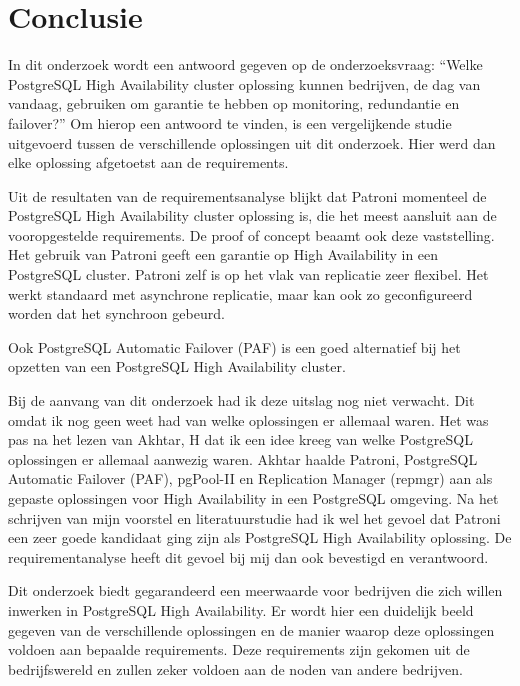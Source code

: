 
\chapter{Conclusie}
\label{ch:conclusie}

In dit onderzoek wordt een antwoord gegeven op de onderzoeksvraag: “Welke PostgreSQL High Availability cluster oplossing kunnen bedrijven, de dag van vandaag, gebruiken om garantie te hebben op monitoring, redundantie en failover?” Om hierop een antwoord te vinden, is een vergelijkende studie uitgevoerd tussen de verschillende oplossingen uit dit onderzoek. Hier werd dan elke oplossing afgetoetst aan de requirements.

Uit de resultaten van de requirementsanalyse blijkt dat Patroni momenteel de PostgreSQL High Availability cluster oplossing is, die het meest aansluit aan de vooropgestelde requirements. De proof of concept beaamt ook deze vaststelling. Het gebruik van Patroni geeft een garantie op High Availability in een PostgreSQL cluster. Patroni zelf is op het vlak van replicatie zeer flexibel. Het werkt standaard met asynchrone replicatie, maar kan ook zo geconfigureerd worden dat het synchroon gebeurd.

Ook PostgreSQL Automatic Failover (PAF) is een goed alternatief bij het opzetten van een PostgreSQL High Availability cluster.


Bij de aanvang van dit onderzoek had ik deze uitslag nog niet verwacht. Dit omdat ik nog geen weet had van welke oplossingen er allemaal waren. Het was pas na het lezen van Akhtar, H dat ik een idee kreeg van welke PostgreSQL oplossingen er allemaal aanwezig waren. Akhtar haalde Patroni, PostgreSQL Automatic Failover (PAF), pgPool-II en Replication Manager (repmgr) aan als gepaste oplossingen voor High Availability in een PostgreSQL omgeving. Na het schrijven van mijn voorstel en literatuurstudie had ik wel het gevoel dat Patroni een zeer goede kandidaat ging zijn als PostgreSQL High Availability oplossing. De requirementanalyse heeft dit gevoel bij mij dan ook bevestigd en verantwoord.

Dit onderzoek biedt gegarandeerd een meerwaarde voor bedrijven die zich willen inwerken in PostgreSQL High Availability. Er wordt hier een duidelijk beeld gegeven van de verschillende oplossingen en de manier waarop deze oplossingen voldoen aan bepaalde requirements. Deze requirements zijn gekomen uit de bedrijfswereld en zullen zeker voldoen aan de noden van andere bedrijven. 

